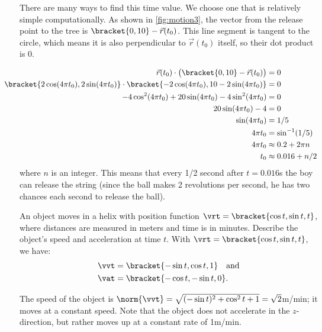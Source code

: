 \begin{example}
\begin{enumerate}
	There are many ways to find this time value. We choose one that is relatively simple computationally. As shown in \autoref{fig:motion3}, the vector from the release point to the tree is $\bracket{0,10}- \vec r(t_0)$. This line segment is tangent to the circle, which means it is also perpendicular to $\vec r(t_0)$ itself, so their dot product is 0.
	
	\begin{align*}
	\vec r(t_0) \cdot \bigl(\bracket{0,10}- \vec r(t_0)\bigr) &=0\\
	\hspace{-2em}
	\bracket{2\cos (4\pi t_0), 2\sin (4\pi t_0)}\cdot\bracket{-2\cos(4\pi t_0),10-2\sin (4\pi t_0)}&=0\\
	-4\cos^2(4\pi t_0) + 20\sin (4\pi t_0)-4\sin^2(4\pi t_0) &= 0\\
	20\sin (4\pi t_0) - 4 &=0\\
	\sin (4\pi t_0) &=1/5\\
	4\pi t_0 &= \sin^{-1}(1/5)\\
	4\pi t_0 &\approx 0.2 + 2\pi n\\%
	t_0 &\approx 0.016 + n/2
	\end{align*}
	where $n$ is an integer.
	This means that every 1/2 second after $t=0.016$s the boy can release the string (since the ball makes 2 revolutions per second, he has two chances each second to release the ball).
\end{enumerate}
\end{example}

\begin{example}\label{ex_motion4}
An object moves in a helix with position function $\vrt =\bracket{\cos t, \sin t, t}$, where distances are measured in meters and time is in minutes. Describe the object's speed and acceleration at time $t$.
\solution
With $\vrt =\bracket{\cos t,\sin t, t}$, we have:
\begin{align*}
\vvt &=\bracket{-\sin t, \cos t, 1}\quad \text{and} \\
\vat &=\bracket{-\cos t, -\sin t, 0}.
\end{align*}

The speed of the object is $\norm{\vvt} = \sqrt{(-\sin t)^2+\cos^2t+1} = \sqrt{2}$m/min; it moves at a constant speed. Note that the object does not accelerate in the $z$-direction, but rather moves up at a constant rate of 1m/min.
\end{example}

